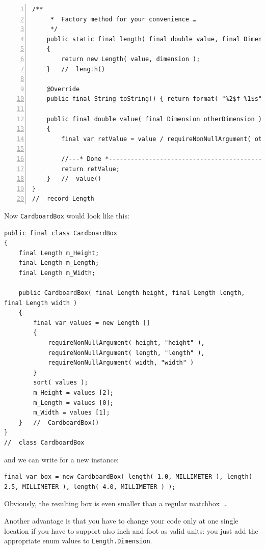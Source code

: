 \documentclass[11pt,a4paper, titlepage, parskip=half, headsepline, footsepline, cleardoublepage=current, headheight=1cm]{scrbook}
\begin{document}
\begin{lstlisting}[numbers=left,caption={Dimensioned Value Length}]
    /**
     *  Factory method for your convenience …
     */
    public static final length( final double value, final Dimension dimension )
    {
        return new Length( value, dimension );
    }   //  length()
    
    @Override
    public final String toString() { return format( "%2$f %1$s", dimension.unit(), value( dimension() ) ); }
    
    public final double value( final Dimension otherDimension ) 
    { 
        final var retValue = value / requireNonNullArgument( otherDimension, "otherDimension" ).factor(); 
        
        //---* Done *------------------------------------------------
        return retValue;
    }   //  value()
}
//  record Length
\end{lstlisting}

Now \lstinline|CardboardBox| would look like this:
\begin{lstlisting}
public final class CardboardBox
{
    final Length m_Height;
    final Length m_Length;
    final Length m_Width;
    
    public CardboardBox( final Length height, final Length length, final Length width )
    {
        final var values = new Length [] 
        { 
            requireNonNullArgument( height, "height" ),
            requireNonNullArgument( length, "length" ),
            requireNonNullArgument( width, "width" )
        }
        sort( values );
        m_Height = values [2];
        m_Length = values [0];
        m_Width = values [1];
    }   //  CardboardBox()
}
//  class CardboardBox
\end{lstlisting}

and we can write for a new instance:
\begin{lstlisting}
final var box = new CardboardBox( length( 1.0, MILLIMETER ), length( 2.5, MILLIMETER ), length( 4.0, MILLIMETER ) );
\end{lstlisting}

Obviously, the resulting box is even smaller than a regular matchbox~…

Another advantage is that you have to change your code only at one single location if you have to support also inch and foot as valid units: you just add the appropriate enum values to \lstinline|Length.Dimension|.

\end{document}
